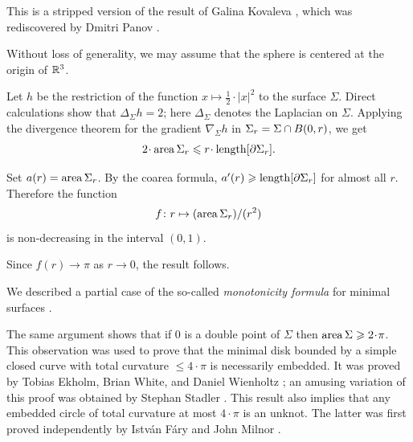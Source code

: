 This is a stripped version of the result of Galina Kovaleva \cite{kovaleva}, which was rediscovered by Dmitri Panov \cite{panov-curves,arnold}.




Without loss of generality, we may assume that the sphere is centered at the origin of $\mathbb{R}^3$.

Let $h$ be the restriction of the function $x\mapsto \tfrac12\cdot|x|^2$ to the surface $\Sigma$.
Direct calculations show that $\Delta_\Sigma h =  2$;
here $\Delta_\Sigma$ denotes the Laplacian on $\Sigma$.
Applying the divergence theorem for the gradient $\nabla_\Sigma h$
in $\Sigma_r\z=\Sigma\cap B(0,r)$, we get
\[2\cdot \area\Sigma_r\le r\cdot\length [\partial\Sigma_r].\]

Set $a(r)=\operatorname{\rm area}\nolimits\Sigma_r$.
By the coarea formula, $a'(r)\geqslant\operatorname{\rm length} [\partial\Sigma_r]$ for almost all $r$.
Therefore the function
\[f\colon r\mapsto (\operatorname{\rm area}\nolimits\Sigma_r)/(r^2)
\]
is non-decreasing in the interval $(0,1)$.

Since $f(r)\to \pi$ as $r\to0$, the result follows.\qeds

We described a partial case of the so-called \emph{monotonicity formula} for minimal surfaces \cite{colding-minicozzi}.

The same argument shows that if $0$ is a double point
of $\Sigma$ then $\area\Sigma\z\ge 2\cdot \pi$.
This observation was used to prove 
that the minimal disk bounded by a simple closed curve with total curvature $\le 4\cdot\pi$ 
is necessarily embedded.
It was proved by 
Tobias Ekholm, 
Brian White,
and Daniel Wienholtz
\cite{EWW};
an amusing variation of this proof
was obtained by 
Stephan Stadler \cite{stadler-FM}.
This result also implies that any embedded circle of total curvature at most $4\cdot\pi$ is an unknot.
The latter was first proved independently by Istv{\'a}n F{\'a}ry \cite{fary-knot} and  John Milnor \cite{milnor}.

